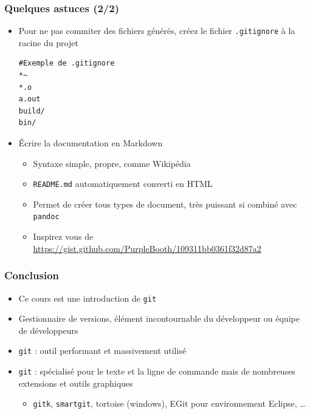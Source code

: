 \documentclass[table,tikz,12pt,svgnames]{beamer}
\begin{document}
\begin{frame}[fragile]
\frametitle{Quelques astuces (2/2)}
\vspace{-1em}
\begin{block}{}
\begin{itemize}
\item Pour ne pas commiter des fichiers générés, créez le fichier \texttt{.gitignore} à la racine du projet
\begin{adjustwidth}{0em}{0cm}
\begin{verbatim}
#Exemple de .gitignore
*~
*.o
a.out
build/
bin/
\end{verbatim}
\end{adjustwidth}
\item Écrire la documentation en Markdown
\begin{itemize}
\item Syntaxe simple, propre, comme Wikipédia
\item \texttt{README.md} automatiquement converti en HTML
\item Permet de créer tous types de document, très puissant si combiné avec \texttt{pandoc}
\item Inspirez vous de \url{https://gist.github.com/PurpleBooth/109311bb0361f32d87a2}
\end{itemize}
\end{itemize}
\end{block}
\end{frame}

\begin{frame}
\frametitle{Conclusion}
\begin{block}{}
\begin{itemize}
\item Ce cours est une \textcolor{title}{introduction} de \texttt{git}
\item Gestionnaire de versions, élément \textcolor{title}{incontournable} du développeur ou
équipe de développeurs
\item \texttt{git} : outil performant et \textcolor{title}{massivement utilisé}
\item \texttt{git} : spécialisé pour le texte et la ligne de commande mais de nombreuses extensions et outils graphiques
\begin{itemize}
\item \texttt{gitk}, \texttt{smartgit}, tortoise (windows), EGit pour environnement Eclipse, \ldots
\end{itemize}
\end{itemize}
\end{block}
\end{frame}
\end{document}
